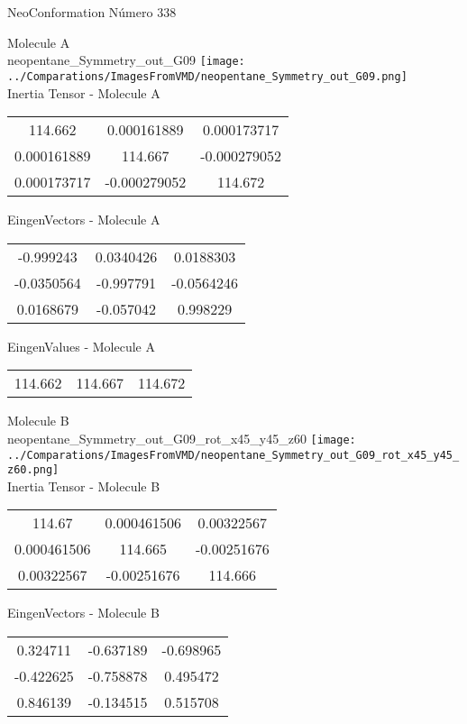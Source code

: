 \vtab[-2cm]
\begin{center}
{\large NeoConformation \tab Número 338}
\end{center}
\begin{multicols}{2}
\begin{center}

Molecule A \\ 
neopentane\_Symmetry\_out\_G09
\texttt{[image: ../Comparations/ImagesFromVMD/neopentane\_Symmetry\_out\_G09.png]}
\\
Inertia Tensor - Molecule A \\
\vtab

\begin{tabular}{|c c c|}
114.662	 & 	0.000161889	 & 	0.000173717	 \\
0.000161889	 & 	114.667	 & 	-0.000279052	 \\
0.000173717	 & 	-0.000279052	 & 	114.672
\end{tabular}

\vtab
 EingenVectors - Molecule A     \\
\vtab
\begin{tabular}{|c c c|}
-0.999243	 & 	0.0340426	 & 	0.0188303	 \\
-0.0350564	 & 	-0.997791	 & 	-0.0564246	 \\
0.0168679	 & 	-0.057042	 & 	0.998229
\end{tabular}

\vtab
 EingenValues - Molecule A     \\
\vtab
\begin{tabular}{|c c c|}
114.662	 & 	114.667	 & 	114.672	 \\
\end{tabular}
\columnbreak

Molecule B \\ 
neopentane\_Symmetry\_out\_G09\_rot\_x45\_y45\_z60
\texttt{[image: ../Comparations/ImagesFromVMD/neopentane\_Symmetry\_out\_G09\_rot\_x45\_y45\_z60.png]}
\\
Inertia Tensor - Molecule B \\
\vtab

\begin{tabular}{|c c c|}
114.67	 & 	0.000461506	 & 	0.00322567	 \\
0.000461506	 & 	114.665	 & 	-0.00251676	 \\
0.00322567	 & 	-0.00251676	 & 	114.666
\end{tabular}

\vtab
 EingenVectors - Molecule B     \\
\vtab
\begin{tabular}{|c c c|}
0.324711	 & 	-0.637189	 & 	-0.698965	 \\
-0.422625	 & 	-0.758878	 & 	0.495472	 \\
0.846139	 & 	-0.134515	 & 	0.515708
\end{tabular}


\end{center}
\end{multicols}
